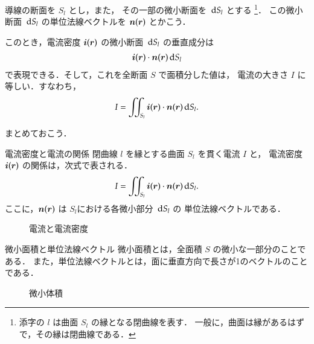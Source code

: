         導線の断面を $S_{l}$ とし，また，
        その一部の微小断面を $\,\mathrm{d} S_{l}$ とする
            \footnote{
                添字の $l$ は曲面 $S_{l}$ の縁となる閉曲線を表す．
                一般に，曲面は縁があるはずで，その縁は閉曲線である．
            }．
        この微小断面 $\,\mathrm{d} S_{l}$ の単位法線ベクトルを $\boldsymbol{n}(\boldsymbol{r})$ とかこう．

        このとき，電流密度 $\boldsymbol{i}(\boldsymbol{r})$ の微小断面 $\,\mathrm{d} S_{l}$ の垂直成分は
            \begin{align*}
                \boldsymbol{i}(\boldsymbol{r}) \cdot \boldsymbol{n}(\boldsymbol{r}) \,\mathrm{d} S_{l}
            \end{align*}
        で表現できる．そして，これを全断面 $S$ で面積分した値は，
        電流の大きさ $I$ に等しい．すなわち，
            \begin{align*}
                I = \int\mspace{-11mu}\int_{S_{l}}\boldsymbol{i}(\boldsymbol{r}) \cdot \boldsymbol{n}(\boldsymbol{r}) \,\mathrm{d} S_{l}.
            \end{align*}

        まとめておこう．
        \begin{myshadebox}{電流密度と電流の関係}
            閉曲線 $l$ を縁とする曲面 $S_{l}$ を貫く電流 $I$ と，
            電流密度 $\boldsymbol{i}(\boldsymbol{r})$ の関係は，次式で表される．
            \begin{align}
                I = \int\mspace{-11mu}\int_{S_{l}}\boldsymbol{i}(\boldsymbol{r}) \cdot \boldsymbol{n}(\boldsymbol{r}) \,\mathrm{d} S_{l}.
            \end{align}
            ここに，$\boldsymbol{n}(\boldsymbol{r})$ は $S_{l}$における各微小部分 $\,\mathrm{d} S_{l}$ の
            単位法線ベクトルである．
        \end{myshadebox}

        \begin{figure}[hbt]
            \begin{center}
                \caption{電流と電流密度}
                \label{fig:LI_si_00}
            \end{center}
        \end{figure}

    \begin{memo}{微小面積と単位法線ベクトル}
        微小面積とは，全面積 $S$ の微小な一部分のことである．
        また，単位法線ベクトルとは，面に垂直方向で長さが1のベクトルのことである．
        \begin{figure}[hbt]
            \begin{center}
                \caption{微小体積}
                \label{fig:EM_smollS}
            \end{center}
        \end{figure}
    \end{memo}

